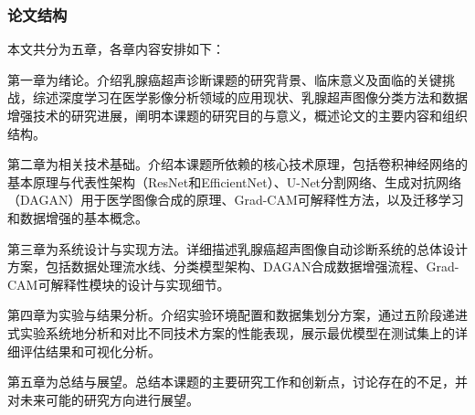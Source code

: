 \subsubsection{论文结构}

本文共分为五章，各章内容安排如下：

第一章为绪论。介绍乳腺癌超声诊断课题的研究背景、临床意义及面临的关键挑战，综述深度学习在医学影像分析领域的应用现状、乳腺超声图像分类方法和数据增强技术的研究进展，阐明本课题的研究目的与意义，概述论文的主要内容和组织结构。

第二章为相关技术基础。介绍本课题所依赖的核心技术原理，包括卷积神经网络的基本原理与代表性架构（ResNet和EfficientNet）、U-Net分割网络、生成对抗网络（DAGAN）用于医学图像合成的原理、Grad-CAM可解释性方法，以及迁移学习和数据增强的基本概念。

第三章为系统设计与实现方法。详细描述乳腺癌超声图像自动诊断系统的总体设计方案，包括数据处理流水线、分类模型架构、DAGAN合成数据增强流程、Grad-CAM可解释性模块的设计与实现细节。

第四章为实验与结果分析。介绍实验环境配置和数据集划分方案，通过五阶段递进式实验系统地分析和对比不同技术方案的性能表现，展示最优模型在测试集上的详细评估结果和可视化分析。

第五章为总结与展望。总结本课题的主要研究工作和创新点，讨论存在的不足，并对未来可能的研究方向进行展望。
